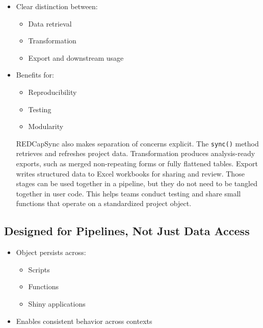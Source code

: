 \begin{itemize}
\tightlist
\item
  Clear distinction between:

  \begin{itemize}
  \tightlist
  \item
    Data retrieval\\
  \item
    Transformation\\
  \item
    Export and downstream usage\\
  \end{itemize}
\item
  Benefits for:

  \begin{itemize}
  \tightlist
  \item
    Reproducibility\\
  \item
    Testing\\
  \item
    Modularity
  \end{itemize}

  REDCapSync also makes separation of concerns explicit. The \texttt{sync()} method retrieves and refreshes project data. Transformation produces analysis-ready exports, such as merged non-repeating forms or fully flattened tables. Export writes structured data to Excel workbooks for sharing and review. Those stages can be used together in a pipeline, but they do not need to be tangled together in user code. This helps teams conduct testing and share small functions that operate on a standardized project object.
\end{itemize}

\subsection{Designed for Pipelines, Not Just Data Access}\label{designed-for-pipelines-not-just-data-access}

\begin{itemize}
\tightlist
\item
  Object persists across:

  \begin{itemize}
  \tightlist
  \item
    Scripts\\
  \item
    Functions\\
  \item
    Shiny applications\\
  \end{itemize}
\item
  Enables consistent behavior across contexts
\end{itemize}

